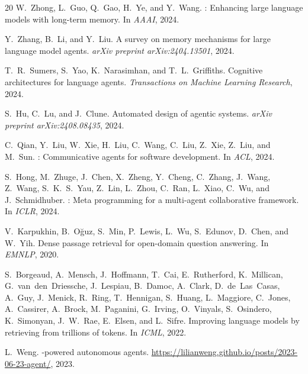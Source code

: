 \documentclass{article}
\begin{document}
\begin{thebibliography}{20}
W.~Zhong, L.~Guo, Q.~Gao, H.~Ye, and Y.~Wang.
: Enhancing large language models with long-term memory.
\newblock In \emph{AAAI}, 2024.

Y.~Zhang, B.~Li, and Y.~Liu.
\newblock A survey on memory mechanisms for large language model agents.
\newblock \emph{arXiv preprint arXiv:2404.13501}, 2024.

T.~R.~Sumers, S.~Yao, K.~Narasimhan, and T.~L.~Griffiths.
\newblock Cognitive architectures for language agents.
\newblock \emph{Transactions on Machine Learning Research}, 2024.

S.~Hu, C.~Lu, and J.~Clune.
\newblock Automated design of agentic systems.
\newblock \emph{arXiv preprint arXiv:2408.08435}, 2024.

C.~Qian, Y.~Liu, W.~Xie, H.~Liu, C.~Wang, C.~Liu, Z.~Xie, Z.~Liu, and M.~Sun.
: Communicative agents for software development.
\newblock In \emph{ACL}, 2024.

S.~Hong, M.~Zhuge, J.~Chen, X.~Zheng, Y.~Cheng, C.~Zhang, J.~Wang, Z.~Wang, S.~K.~S.~Yau, Z.~Lin, L.~Zhou, C.~Ran, L.~Xiao, C.~Wu, and J.~Schmidhuber.
: Meta programming for a multi-agent collaborative framework.
\newblock In \emph{ICLR}, 2024.

V.~Karpukhin, B.~O{\u{g}}uz, S.~Min, P.~Lewis, L.~Wu, S.~Edunov, D.~Chen, and W.~Yih.
\newblock Dense passage retrieval for open-domain question answering.
\newblock In \emph{EMNLP}, 2020.

S.~Borgeaud, A.~Mensch, J.~Hoffmann, T.~Cai, E.~Rutherford, K.~Millican, G.~van~den~Driessche, J.~Lespiau, B.~Damoc, A.~Clark, D.~de~Las~Casas, A.~Guy, J.~Menick, R.~Ring, T.~Hennigan, S.~Huang, L.~Maggiore, C.~Jones, A.~Cassirer, A.~Brock, M.~Paganini, G.~Irving, O.~Vinyals, S.~Osindero, K.~Simonyan, J.~W.~Rae, E.~Elsen, and L.~Sifre.
\newblock Improving language models by retrieving from trillions of tokens.
\newblock In \emph{ICML}, 2022.

L.~Weng.
-powered autonomous agents.
\newblock \url{https://lilianweng.github.io/posts/2023-06-23-agent/}, 2023.

\end{thebibliography}
\end{document}
